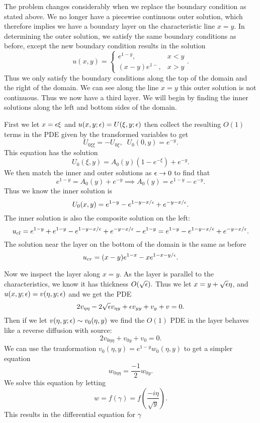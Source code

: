 \item The problem changes considerably when we replace the boundary condition as stated above. We no longer have a piecewise continuous outer solution, which therefore implies we have a boundary layer on the characteristic line $x=y.$ In determining the outer solution, we satisfy the same boundary conditions as before, except the new boundary condition results in the solution
    $$u(x,y)=\left\{\begin{array}{cc}e^{1-y},&x<y\\(x-y)e^{1-},&x>y\end{array}\right..$$
    Thus we only satisfy the boundary conditions along the top of the domain and the right of the domain. We can see along the line $x=y$ this outer solution is not continuous. Thus we now have a third layer. We will begin by finding the inner solutions along the left and bottom sides of the domain.
    \benum
    \item First we let $x=\epsilon \xi$ and $u(x,y;\epsilon)=U(\xi,y;\epsilon)$ then collect the resulting $O(1)$ terms in the PDE given by the transformed variables to get
        $$U_{0\xi\xi}=-U_{0\xi},\;\;U_0(0,y)=e^{-y}.$$
        This equation has the solution
        $$U_0(\xi,y)=A_0(y)(1-e^{-\xi})+e^{-y}.$$
        We then match the inner and outer solutions as $\epsilon\to 0$ to find that
        $$e^{1-y}=A_0(y)+e^{-y}\implies A_0(y)=e^{1-y}-e^{-y}.$$
        Thus we know the inner solution is
        $$U_0(x,y)=e^{1-y}-e^{1-y-x/\epsilon}+e^{-y-x/\epsilon}.$$
        The inner solution is also the composite solution on the left:
        $$u_{cl}=e^{1-y}+e^{1-y}-e^{1-y-x/\epsilon}+e^{-y-x/\epsilon}-e^{1-y}=e^{1-y}-e^{1-y-x/\epsilon}+e^{-y-x/\epsilon}.$$
        The solution near the layer on the bottom of the domain is the same as before
        $$u_{cr}=(x-y)e^{1-x}-xe^{1-x-y/\epsilon}.$$
    \item Now we inspect the layer along $x=y$. As the layer is parallel to the characteristics, we know it has thickness $O(\sqrt{\epsilon}).$ Thus we let $x=y+\sqrt{\epsilon}\eta$, and $u(x,y;\epsilon)=v(\eta,y;\epsilon)$ and we get the PDE
        $$2v_{\eta\eta}-2\sqrt{\epsilon}v_{\eta y}+\epsilon v_{yy}+v_y+v=0.$$
        Then if we let $v(\eta,y;\epsilon)\sim v_0(\eta,y)$ we find the $O(1)$ PDE in the layer behaves like a reverse diffusion with source:
        $$2v_{0\eta\eta}+v_{0y}+v_0=0.$$
        We can use the tranformation $v_0(\eta,y)=e^{1-y}w_0(\eta,y)$ to get a simpler equation
        $$w_{0\eta\eta}=\frac{-1}{2}w_{0y}.$$
        We solve this equation by letting
        $$w=f(\gamma)=f\left(\frac{-i\eta}{\sqrt{y}}\right).$$
        This results in the differential equation for $\gamma$
